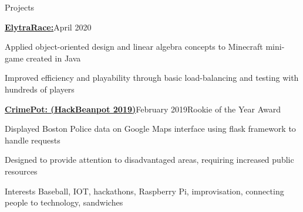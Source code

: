 \documentclass{resume}
\begin{document}
\begin{rSection}{Projects}

\begin{rSubsection}{\href{https://www.github.com/kyleposluns/elytrarace}{{\bf ElytraRace:}}}{April 2020}{}{}
\item Applied object-oriented design and linear algebra concepts to Minecraft mini-game created in Java
\item Improved efficiency and playability through basic load-balancing and testing with hundreds of players
\end{rSubsection}

\begin{rSubsection}{\href{https://www.devpost.com/software/CrimePot}{{\bf CrimePot: (HackBeanpot 2019)}}}{February 2019}{Rookie of the Year Award}{}
\item Displayed Boston Police data on Google Maps interface using flask framework to handle requests
\item Designed to provide attention to disadvantaged areas, requiring increased public resources
\end{rSubsection}

\end{rSection}

\begin{rSection}{Interests}\itemsep -5pt
Baseball, IOT, hackathons, Raspberry Pi, improvisation, connecting people to technology, sandwiches
\end{rSection}
\end{document}
